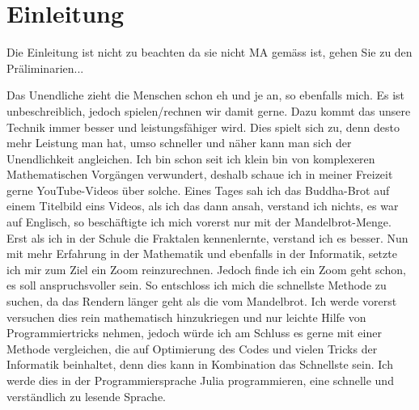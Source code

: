 \section{Einleitung}

Die Einleitung ist nicht zu beachten da sie nicht MA gemäss ist, gehen Sie zu den Präliminarien...

Das Unendliche zieht die Menschen schon eh und je an, so ebenfalls mich. Es ist unbeschreiblich, jedoch spielen/rechnen wir damit gerne. Dazu kommt das unsere Technik immer besser und leistungsfähiger wird. Dies spielt sich zu, denn desto mehr Leistung man hat, umso schneller und näher kann man sich der Unendlichkeit angleichen. Ich bin schon seit ich klein bin von komplexeren Mathematischen Vorgängen verwundert, deshalb schaue ich in meiner Freizeit gerne YouTube-Videos über solche. Eines Tages sah ich das Buddha-Brot auf einem Titelbild eins Videos, als ich das dann ansah, verstand ich nichts, es war auf Englisch, so beschäftigte ich mich vorerst nur mit der Mandelbrot-Menge. Erst als ich in der Schule die Fraktalen kennenlernte, verstand ich es besser. Nun mit mehr Erfahrung in der Mathematik und ebenfalls in der Informatik, setzte ich mir zum Ziel ein Zoom reinzurechnen. Jedoch finde ich ein Zoom geht schon, es soll anspruchsvoller sein. So entschloss ich mich die schnellste Methode zu suchen, da das Rendern länger geht als die vom Mandelbrot. Ich werde vorerst versuchen dies rein mathematisch hinzukriegen und nur leichte Hilfe von Programmiertricks nehmen, jedoch würde ich am Schluss es gerne mit einer Methode vergleichen, die auf Optimierung des Codes und vielen Tricks der Informatik beinhaltet, denn dies kann in Kombination das Schnellste sein. Ich werde dies in der Programmiersprache Julia programmieren, eine schnelle und verständlich zu lesende Sprache.
